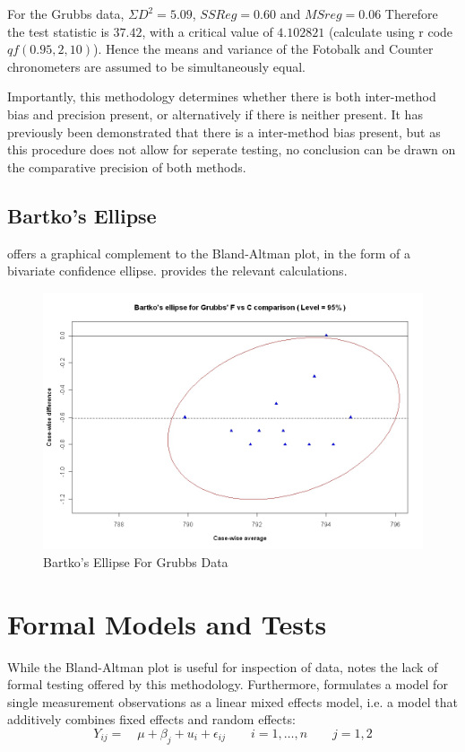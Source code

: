 \documentclass[12pt, a4paper]{report}
\theoremstyle{plain}
\theoremstyle{definition}
\theoremstyle{remark}
\begin{document}
For the Grubbs data, $\Sigma D^{2}=5.09 $, $SSReg = 0.60$ and
$MSreg=0.06$ Therefore the test statistic is $37.42$, with a
critical value of $4.102821$ (calculate using r code
$qf(0.95,2,10)$). Hence the means and variance of the Fotobalk and
Counter chronometers are assumed to be simultaneously equal.

Importantly, this methodology determines whether there is both
inter-method bias and precision present, or alternatively if there
is neither present. It has previously been demonstrated that there
is a inter-method bias present, but as this procedure does not
allow for seperate testing, no conclusion can be drawn on the
comparative precision of both methods.
\newpage
\subsection{Bartko's Ellipse}
\citet{Bartko} offers a graphical complement to the Bland-Altman
plot, in the form of a bivariate confidence ellipse.
\citet{AltmanEllipse} provides the relevant calculations.

\begin{figure}[h!]
	\includegraphics[width=130mm]{images/GrubbsBartko.jpeg}
	\caption{Bartko's Ellipse For Grubbs Data}\label{GrubbsBartko}
\end{figure}	\section{Formal Models and Tests}
	While the Bland-Altman plot is useful for inspection of data, \citet{Kinsella} notes the lack of formal testing offered by
	this methodology. Furthermore, \citet{Kinsella} formulates a model for
	single measurement observations as a
	linear mixed effects model, i.e. a model that additively combines
	fixed effects and random effects:
	\[
	Y_{ij} =\quad \mu + \beta_{j} + u_{i} + \epsilon_{ij} \qquad i = 1,\dots,n
	\qquad j=1,2\]
	
\end{document}
